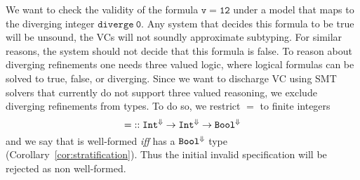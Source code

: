 We want to check the validity of the formula $\mathtt{v = 12}$
under a model that maps \ttv to the diverging integer $\mathtt{diverge \ 0}$.
%
Any system that decides this formula to be true
will be unsound, \ie the VCs will not soundly approximate subtyping.
%
For similar reasons, the system should not decide that this formula is false.
%
To reason about diverging refinements one needs three valued logic, 
where logical formulas can be solved to true, false, or diverging.
%
Since we want to discharge VC using SMT solvers that currently do not support 
three valued reasoning, we exclude diverging refinements from types.
%
To do so, we restrict $\mathtt{=}$ to finite integers
$$ \mathtt{=} :: {\tint^{\finite}}\rightarrow{\tint^\finite}\rightarrow{\tbool^\finite}$$
and we say that  
is well-formed \emph{iff}  has a $\texttt{Bool}^{\Downarrow}$ type (Corollary~\ref{cor:stratification}).
%
Thus the initial invalid specification will be rejected as non well-formed.

%



